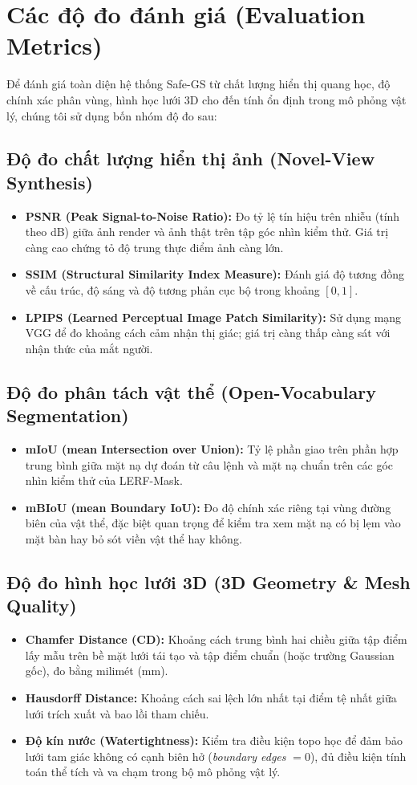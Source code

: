 \section{Các độ đo đánh giá (Evaluation Metrics)}
Để đánh giá toàn diện hệ thống Safe-GS từ chất lượng hiển thị quang học, độ chính xác phân vùng, hình học lưới 3D cho đến tính ổn định trong mô phỏng vật lý, chúng tôi sử dụng bốn nhóm độ đo sau:

\subsection{Độ đo chất lượng hiển thị ảnh (Novel-View Synthesis)}
\begin{itemize}
    \item \textbf{PSNR (Peak Signal-to-Noise Ratio):} Đo tỷ lệ tín hiệu trên nhiễu (tính theo dB) giữa ảnh render và ảnh thật trên tập góc nhìn kiểm thử. Giá trị càng cao chứng tỏ độ trung thực điểm ảnh càng lớn.
    \item \textbf{SSIM (Structural Similarity Index Measure):} Đánh giá độ tương đồng về cấu trúc, độ sáng và độ tương phản cục bộ trong khoảng $[0, 1]$.
    \item \textbf{LPIPS (Learned Perceptual Image Patch Similarity):} Sử dụng mạng VGG để đo khoảng cách cảm nhận thị giác; giá trị càng thấp càng sát với nhận thức của mắt người.
\end{itemize}

\subsection{Độ đo phân tách vật thể (Open-Vocabulary Segmentation)}
\begin{itemize}
    \item \textbf{mIoU (mean Intersection over Union):} Tỷ lệ phần giao trên phần hợp trung bình giữa mặt nạ dự đoán từ câu lệnh và mặt nạ chuẩn trên các góc nhìn kiểm thử của LERF-Mask.
    \item \textbf{mBIoU (mean Boundary IoU):} Đo độ chính xác riêng tại vùng đường biên của vật thể, đặc biệt quan trọng để kiểm tra xem mặt nạ có bị lẹm vào mặt bàn hay bỏ sót viền vật thể hay không.
\end{itemize}

\subsection{Độ đo hình học lưới 3D (3D Geometry \& Mesh Quality)}
\begin{itemize}
    \item \textbf{Chamfer Distance (CD):} Khoảng cách trung bình hai chiều giữa tập điểm lấy mẫu trên bề mặt lưới tái tạo và tập điểm chuẩn (hoặc trường Gaussian gốc), đo bằng milimét (mm).
    \item \textbf{Hausdorff Distance:} Khoảng cách sai lệch lớn nhất tại điểm tệ nhất giữa lưới trích xuất và bao lồi tham chiếu.
    \item \textbf{Độ kín nước (Watertightness):} Kiểm tra điều kiện topo học để đảm bảo lưới tam giác không có cạnh biên hở (\textit{boundary edges} $= 0$), đủ điều kiện tính toán thể tích và va chạm trong bộ mô phỏng vật lý.
\end{itemize}

